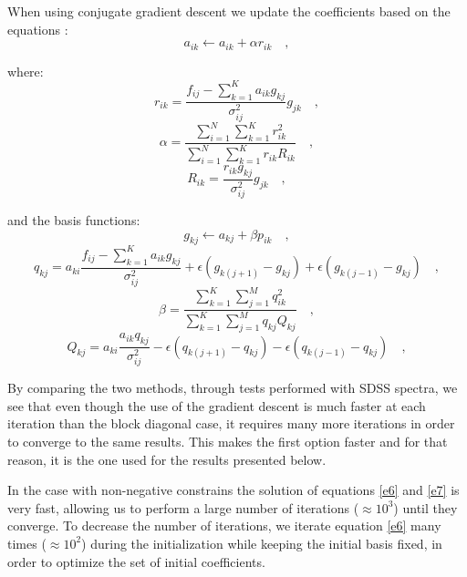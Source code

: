 \documentclass[12pt,preprint]{aastex}
\begin{document}
When using conjugate gradient descent we update the coefficients based
on the equations \citep[for example, ][]{shewchuk}:
\begin{equation}\label{e10}
a_{ik} \gets a_{ik}+\alpha r_{ik}
\quad ,
\end{equation}

where:
\begin{equation}\label{e11}
r_{ik}=\frac{f_{ij}-\sum_{k=1}^{K}a_{ik}g_{kj}}{\sigma^2_{ij}}g_{jk}
\quad ,
\end{equation}
\begin{equation}\label{e12}
\alpha=\frac{\sum_{i=1}^{N}\sum_{k=1}^{K}r^2_{ik}}{\sum_{i=1}^{N}\sum_{k=1}^{K}r_{ik}R_{ik}}
\quad ,
\end{equation}
\begin{equation}\label{e13}
R_{ik}=\frac{r_{ik}g_{kj}}{\sigma^2_{ij}}g_{jk}
\quad ,
\end{equation}

and the basis functions:
\begin{equation}\label{e14}
g_{kj} \gets a_{kj}+\beta p_{ik}
\quad ,
\end{equation}
\begin{equation}\label{e15}
q_{kj}=a_{ki}\frac{f_{ij}-\sum_{k=1}^{K}a_{ik}g_{kj}}{\sigma^2_{ij}}+\epsilon(g_{k(j+1)}-g_{kj})+\epsilon(g_{k(j-1)}-g_{kj})
\quad ,
\end{equation}
\begin{equation}\label{e16}
\beta=\frac{\sum_{k=1}^{K}\sum_{j=1}^{M}q^2_{ik}}{\sum_{k=1}^{K}\sum_{j=1}^{M}q_{kj}Q_{kj}}
\quad ,
\end{equation}
\begin{equation}\label{e17}
Q_{kj}=a_{ki}\frac{a_{ik}q_{kj}}{\sigma^2_{ij}}-\epsilon(q_{k(j+1)}-q_{kj})-\epsilon(q_{k(j-1)}-q_{kj})
\quad ,
\end{equation}

By comparing the two methods, through tests performed with SDSS spectra, we see that even though the use of the gradient descent is much faster at each iteration than the block diagonal case, it requires many more iterations in order to converge to the same results. This makes the first option faster and for that reason, it is the one used for the results presented below.

In the case with non-negative constrains the solution of equations \ref{e6} and \ref{e7} is very fast, allowing us to perform a large number of iterations ($\approx 10^3$) until they converge. To decrease the number of iterations, we iterate equation \ref{e6} many times ($\approx 10^2$) during the initialization while keeping the initial basis fixed, in order to optimize the set of initial coefficients.
\end{document}
